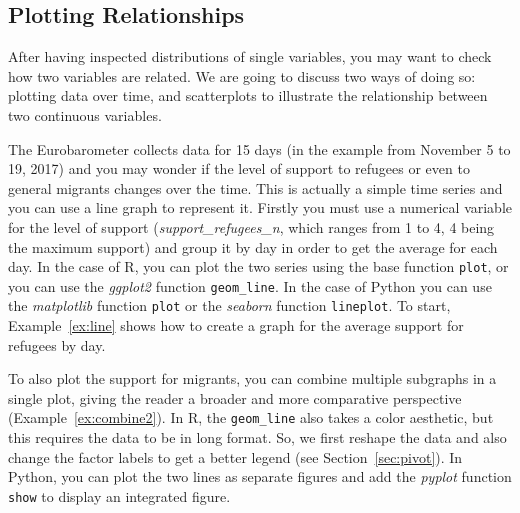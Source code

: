 



\subsection{Plotting Relationships}\label{sec:plotrelation}

After having inspected distributions of single variables, you may want to check how two variables are related. We are going to discuss two ways of doing so: plotting data over time, and scatterplots to illustrate the relationship between two continuous variables.

The Eurobarometer collects data for 15 days (in the example from November 5 to 19, 2017) and you may wonder if the level of support to refugees or even to general migrants changes over the time. This is actually a simple time series and you can use a line graph to represent it. Firstly you must use a numerical variable for the level of support (\emph{support\_refugees\_n}, which ranges from 1 to 4, 4 being the maximum support) and group it by day in order to get the average for each day. In the case of R, you can plot the two series using the base function \texttt{plot}, or you can use the \emph{ggplot2} function \texttt{geom\_line}. In the case of Python you can use the \emph{matplotlib} function \texttt{plot} or the \emph{seaborn} function \texttt{lineplot}. To start, Example~\ref{ex:line} shows how to create a graph for the average support for refugees by day.



To also plot the support for migrants, you can combine multiple subgraphs in a single plot,
giving the reader a broader and more comparative perspective (Example~\ref{ex:combine2}).
In R, the \texttt{geom\_line} also takes a color aesthetic, but this requires the data to be in long format.
So, we first reshape the data and also change the factor labels to get a better legend (see Section~\ref{sec:pivot}).
In Python, you can plot the two lines as separate figures  and add the \emph{pyplot} function \texttt{show} to display an integrated figure.

